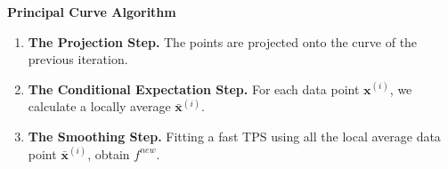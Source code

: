 \documentclass[9 pt]{beamer}
\def\xii{\mathbf{x}^{(i)}}
\begin{document}
\begin{frame}
{\bf Principal Curve Algorithm}
\begin{enumerate}
\item{\bf The Projection Step.} The points are projected onto the curve of the previous iteration.
\item{\bf The Conditional Expectation Step.} For each data point $\xii$, we calculate a locally average $\bar{\mathbf{x}}^{(i)}$.
\item{\bf The Smoothing Step.} Fitting a fast TPS using all the local average data point $\bar{\mathbf{x}}^{(i)}$, obtain $f^{new}$.
\end{enumerate}
\begin{figure}[ht]
\begin{minipage}[b]{0.45\linewidth}
\centering
{}
\end{minipage}
\begin{minipage}[b]{0.45\linewidth}
\centering
{}
\end{minipage}
\end{figure}
\end{frame}
\end{document}
